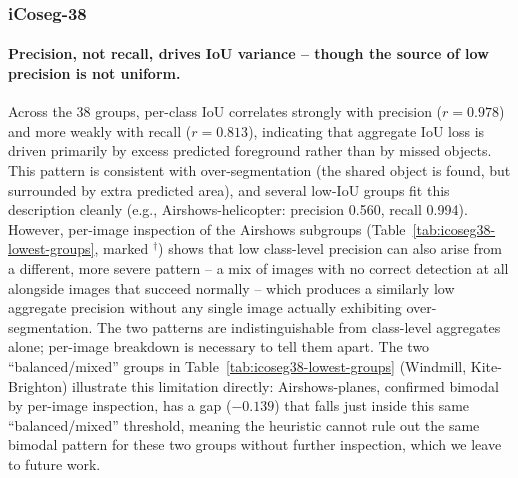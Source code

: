 \subsubsection{iCoseg-38}
\label{sec:per-class-icoseg}

\paragraph{Precision, not recall, drives IoU variance -- though the source of low precision is not uniform.} Across the 38 groups, per-class IoU correlates strongly with precision ($r=0.978$) and more weakly with recall ($r=0.813$), indicating that aggregate IoU loss is driven primarily by excess predicted foreground rather than by missed objects. This pattern is consistent with over-segmentation (the shared object is found, but surrounded by extra predicted area), and several low-IoU groups fit this description cleanly (e.g., Airshows-helicopter: precision 0.560, recall 0.994). However, per-image inspection of the Airshows subgroups (Table~\ref{tab:icoseg38-lowest-groups}, marked $^\dagger$) shows that low class-level precision can also arise from a different, more severe pattern -- a mix of images with no correct detection at all alongside images that succeed normally -- which produces a similarly low aggregate precision without any single image actually exhibiting over-segmentation. The two patterns are indistinguishable from class-level aggregates alone; per-image breakdown is necessary to tell them apart. The two ``balanced/mixed'' groups in Table~\ref{tab:icoseg38-lowest-groups} (Windmill, Kite-Brighton) illustrate this limitation directly: Airshows-planes, confirmed bimodal by per-image inspection, has a gap ($-0.139$) that falls just inside this same ``balanced/mixed'' threshold, meaning the heuristic cannot rule out the same bimodal pattern for these two groups without further inspection, which we leave to future work.
